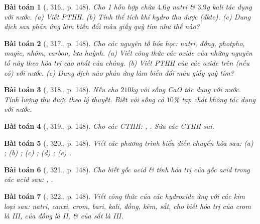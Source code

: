 \documentclass{article}
\newtheorem{baitoan}{Bài toán}
\begin{document}
\begin{baitoan}[\cite{An_400_BT_Hoa_Hoc_8_2020}, 316., p. 148]
	Cho 1 hỗn hợp chứa $4.6$\emph{g} natri \& $3.9$\emph{g} kali tác dụng với nước. (a) Viết PTHH. (b) Tính thể tích khí hydro thu được (đktc). (c) Dung dịch sau phản ứng làm biến đổi màu giấy quỳ tím như thế nào?
\end{baitoan}

\begin{baitoan}[\cite{An_400_BT_Hoa_Hoc_8_2020}, 317., p. 148]
	Cho các nguyên tố hóa học: natri, đồng, photpho, magie, nhôm, carbon, lưu huỳnh. (a) Viết công thức các oxide của những nguyên tố này theo hóa trị cao nhất của chúng. (b) Viết PTHH của các oxide trên (nếu có) với nước. (c) Dung dịch nào phản ứng làm biến đổi màu giấy quỳ tím?
\end{baitoan}

\begin{baitoan}[\cite{An_400_BT_Hoa_Hoc_8_2020}, 318., p. 148]
	Nếu cho $210$\emph{kg} vôi sống \emph{CaO} tác dụng với nước. Tính lượng \emph{} thu được theo lý thuyết. Biết vôi sống có $10$\% tạp chát không tác dụng với nước.
\end{baitoan}

\begin{baitoan}[\cite{An_400_BT_Hoa_Hoc_8_2020}, 319., p. 148]
	Cho các CTHH: \emph{, }. Sửa các CTHH sai.
\end{baitoan}

\begin{baitoan}[\cite{An_400_BT_Hoa_Hoc_8_2020}, 320., p. 148]
	Viết các phương trình biểu diễn chuyển hóa sau: (a) \emph{}; (b) \emph{}; (c) \emph{}; (d) \emph{}; (e) \emph{}.
\end{baitoan}

\begin{baitoan}[\cite{An_400_BT_Hoa_Hoc_8_2020}, 321., p. 148]
	Cho biết gốc acid \& tính hóa trị của gốc acid trong các acid sau: \emph{, }.
\end{baitoan}

\begin{baitoan}[\cite{An_400_BT_Hoa_Hoc_8_2020}, 322., p. 148]
	Viết công thức của các hydroxide ứng với các kim loại sau: natri, canxi, crom, bari, kali, đồng, kẽm, sắt, cho biết hóa trị của crom là III, của đồng là II, \& của sắt là III.
\end{baitoan}
\end{document}
